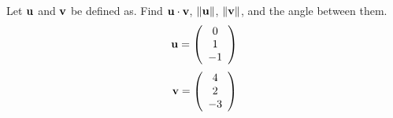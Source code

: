 \begin{problem}
    Let ${\bf u}$ and ${\bf v}$ be defined as.  Find ${\bf u} \cdot {\bf v}$, $\|{\bf u}\|$, $\|{\bf v}\|$, and
    the angle between them.
    \[ {\bf u} = \left( \begin{array}{c} 0 \\ 1 \\ -1 \end{array} \right) \]
    \[ {\bf v} = \left( \begin{array}{c} 4 \\ 2 \\ -3 \end{array} \right) \]
% 
\end{problem}
%             
